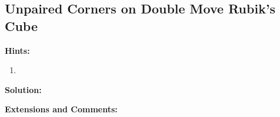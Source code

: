 \subsection{Unpaired Corners on Double Move Rubik's Cube}

\textbf{Hints:}

\begin{enumerate}
    \item 
\end{enumerate}

\textbf{Solution:}



\textbf{Extensions and Comments:}
